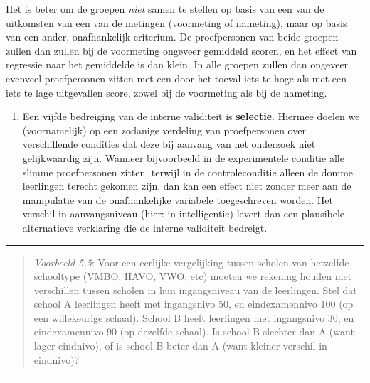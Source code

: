 \documentclass[
]{book}
\providecommand{\tightlist}{%
  \setlength{\itemsep}{0pt}\setlength{\parskip}{0pt}}
\begin{document}
Het is beter om de groepen \emph{niet} samen te stellen op basis van een van
de uitkomsten van een van de metingen (voormeting of nameting), maar op
basis van een ander, onafhankelijk criterium. De proefpersonen van beide
groepen zullen dan zullen bij de voormeting ongeveer gemiddeld scoren,
en het effect van regressie naar het gemiddelde is dan klein. In alle
groepen zullen dan ongeveer evenveel proefpersonen zitten met een door
het toeval iets te hoge als met een iets te lage uitgevallen score,
zowel bij de voormeting als bij de nameting.

\begin{enumerate}
\def\labelenumi{\arabic{enumi}.}
\setcounter{enumi}{4}
\tightlist
\item
  Een vijfde bedreiging van de interne validiteit is \textbf{selectie}.
  Hiermee doelen we (voornamelijk) op een
  zodanige verdeling van proefpersonen over verschillende condities dat
  deze bij aanvang van het onderzoek niet gelijkwaardig zijn. Wanneer
  bijvoorbeeld in de experimentele conditie alle slimme proefpersonen
  zitten, terwijl in de controleconditie alleen de domme leerlingen
  terecht gekomen zijn, dan kan een effect niet zonder meer aan de
  manipulatie van de onafhankelijke variabele toegeschreven worden. Het
  verschil in aanvangsniveau (hier: in intelligentie) levert dan een
  plausibele alternatieve verklaring die de interne validiteit bedreigt.
\end{enumerate}

\begin{center}\rule{0.5\linewidth}{0.5pt}\end{center}

\begin{quote}
\emph{Voorbeeld 5.5}: Voor een eerlijke vergelijking tussen scholen van hetzelfde schooltype
(VMBO, HAVO, VWO, etc) moeten we rekening houden met verschillen tussen
scholen in hun ingangsniveau van de leerlingen. Stel dat school A
leerlingen heeft met ingangsnivo 50, en eindexamennivo 100 (op een
willekeurige schaal). School B heeft leerlingen met ingangsnivo 30, en
eindexamennivo 90 (op dezelfde schaal). Is school B slechter dan A (want
lager eindnivo), of is school B beter dan A (want kleiner verschil in
eindnivo)?
\end{quote}

\begin{center}\rule{0.5\linewidth}{0.5pt}\end{center}
\end{document}
